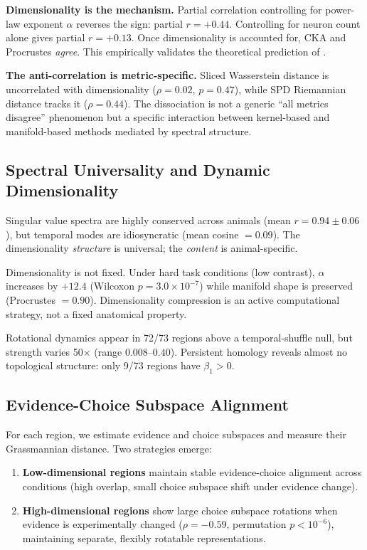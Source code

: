 \documentclass{article}
\begin{document}
\textbf{Dimensionality is the mechanism.} Partial correlation controlling for power-law exponent $\alpha$ reverses the sign: partial $r = +0.44$. Controlling for neuron count alone gives partial $r = +0.13$. Once dimensionality is accounted for, CKA and Procrustes \emph{agree}. This empirically validates the theoretical prediction of \citet{harvey2024representational}.

\textbf{The anti-correlation is metric-specific.} Sliced Wasserstein distance is uncorrelated with dimensionality ($\rho = 0.02$, $p = 0.47$), while SPD Riemannian distance tracks it ($\rho = 0.44$). The dissociation is not a generic ``all metrics disagree'' phenomenon but a specific interaction between kernel-based and manifold-based methods mediated by spectral structure.

\subsection{Spectral Universality and Dynamic Dimensionality}

Singular value spectra are highly conserved across animals (mean $r = 0.94 \pm 0.06$), but temporal modes are idiosyncratic (mean cosine $= 0.09$). The dimensionality \emph{structure} is universal; the \emph{content} is animal-specific.

Dimensionality is not fixed. Under hard task conditions (low contrast), $\alpha$ increases by $+12.4$ (Wilcoxon $p = 3.0 \times 10^{-7}$) while manifold shape is preserved (Procrustes $= 0.90$). Dimensionality compression is an active computational strategy, not a fixed anatomical property.

Rotational dynamics appear in 72/73 regions above a temporal-shuffle null, but strength varies 50$\times$ (range $0.008$--$0.40$). Persistent homology reveals almost no topological structure: only 9/73 regions have $\beta_1 > 0$.

\subsection{Evidence-Choice Subspace Alignment}

For each region, we estimate evidence and choice subspaces and measure their Grassmannian distance. Two strategies emerge:

\begin{enumerate}
\item \textbf{Low-dimensional regions} maintain stable evidence-choice alignment across conditions (high overlap, small choice subspace shift under evidence change).
\item \textbf{High-dimensional regions} show large choice subspace rotations when evidence is experimentally changed ($\rho = -0.59$, permutation $p < 10^{-6}$), maintaining separate, flexibly rotatable representations.
\end{enumerate}
\end{document}
